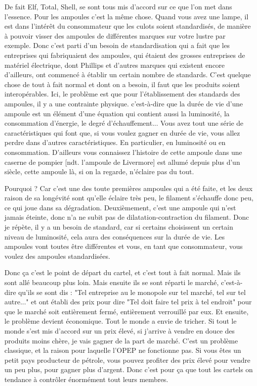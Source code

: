 \begin{small}
De fait Elf, Total, Shell, se sont tous mis d'accord sur ce que l'on met dans l'essence. Pour les ampoules c'est la même chose. Quand vous avez une lampe, il est dans l'intérêt du consommateur que les culots soient standardisés, de manière à pouvoir visser des ampoules de différentes marques sur votre lustre par exemple.
Donc c'est parti d'un besoin de standardisation qui a fait que les entreprises qui fabriquaient des ampoules, qui étaient des grosses entreprises de matériel électrique, dont Phillips et d'autres marques qui existent encore d'ailleurs, ont commencé à établir un certain nombre de standards.
C'est quelque chose de tout à fait normal et dont on a besoin, il faut que les produits soient interopérables.
Ici, le problème est que pour l'établissement des standards des ampoules, il y a une contrainte physique.
c'est-à-dire que la durée de vie d'une ampoule est un élément d'une équation qui contient aussi la luminosité, la consommation d'énergie, le degré d'échauffement...
Vous avez tout une série de caractéristiques qui font que, si vous voulez gagner en durée de vie, vous allez perdre dans d'autres caractéristiques. En particulier, en luminosité ou en consommation. D'ailleurs vous connaissez l'histoire de cette ampoule dans une caserne de pompier [ndt. l'ampoule de Livermore] est allumé depuis plus d'un siècle, cette ampoule là, si on la regarde, n'éclaire pas du tout.

Pourquoi ? Car c'est une des toute premières ampoules qui a été faite, et les deux raison de sa longévité sont qu'elle éclaire très peu, le filament s'échauffe donc peu, ce qui joue dans sa dégradation. Deuxièmement, c'est une ampoule qui n'est jamais éteinte, donc n'a ne subit pas de dilatation-contraction du filament.
Donc je répète, il y a un besoin de standard, car si certains choisissent un certain niveau de luminosité, cela aura des conséquences sur la durée de vie.
Les ampoules vont toutes être différentes et vous, en tant que consommateur, vous voulez des ampoules standardisées.

Donc ça c'est le point de départ du cartel, et c'est tout à fait normal. Mais ils sont allé beaucoup plus loin.
Mais ensuite ils se sont réparti le marché, c'est-à-dire qu'ils se sont dis : "Tel entreprise au le monopole sur tel marché, tel sur tel autre..." et ont établi des prix pour dire "Tel doit faire tel prix à tel endroit" pour que le marché soit entièrement fermé, entièrement verrouillé par eux. Et ensuite, le problème devient économique. Tout le monde a envie de tricher. Si tout le monde s'est mis d'accord sur un prix élevé, si j'arrive à vendre en douce des produits moins chère, je vais gagner de la part de marché. C'est un problème classique, et la raison pour laquelle l'OPEP ne fonctionne pas. Si vous êtes un petit pays producteur de pétrole, vous pouvez profiter des prix élevé pour vendre un peu plus, pour gagner plus d'argent. Donc c'est pour ça que tout les cartels on tendance à contrôler énormément tout leurs membres.


\end{small}
